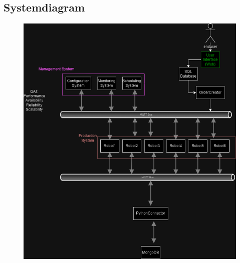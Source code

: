 \subsection{Systemdiagram}
\label{sec:systemdiagram}
\begin{figure}[H]
    \centering
    \includegraphics[width=0.8\linewidth]{Images/Systemdiagram.drawio.png}
    \label{fig:systemdiagram}
\end{figure}

\newpage

